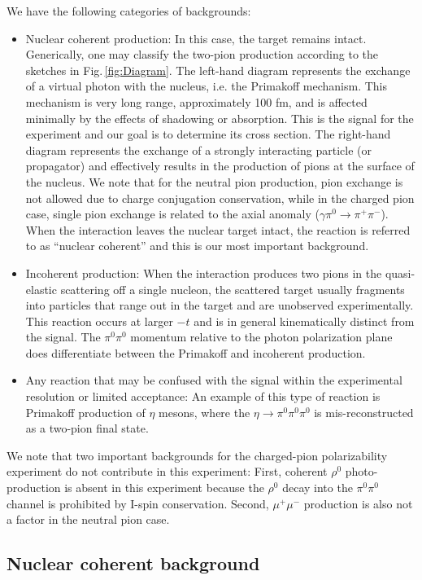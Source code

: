 We have the following categories of backgrounds:
\begin{itemize}
\item Nuclear coherent production: In this case, the target remains intact. Generically, one may classify the two-pion production
according to the sketches in Fig.\,\ref{fig:Diagram}. The left-hand diagram represents the exchange of a virtual photon with the nucleus, i.e. the Primakoff
mechanism. This mechanism is very long range, approximately 100 fm, and is affected minimally by the effects of shadowing or absorption.  This is the signal for the
experiment and our goal is to determine its cross section.
The right-hand diagram represents the exchange of a strongly interacting particle (or propagator) and effectively results in the production of pions at the
surface of the nucleus. We note that for the neutral pion production, pion exchange is not allowed due to charge conjugation conservation, while 
in the charged pion case, single pion exchange is related to the axial anomaly ($\gamma \pi^0 \rightarrow \pi^+ \pi^-$).  When the interaction leaves the
nuclear target intact, the reaction is referred to as ``nuclear coherent'' and this is our most important background. 
\item Incoherent production:  When the interaction produces two pions in the quasi-elastic scattering off a single
nucleon, the scattered target usually fragments into particles that range out in the target and are unobserved experimentally. This reaction occurs at larger $-t$ and is in general
kinematically distinct from the signal. The $\pi^0\pi^0$ momentum relative to the photon polarization plane does differentiate between the Primakoff and incoherent production.
\item Any reaction that may be confused with the signal within the experimental resolution or limited acceptance:
 An example of this type of reaction is Primakoff production of $\eta$ mesons, where the $\eta\rightarrow \pi^0 \pi^0 \pi^0$  is
mis-reconstructed as a two-pion final state. 
\end{itemize}

We note that two important backgrounds for the charged-pion polarizability experiment do not contribute in this experiment:
First, coherent $\rho^0$ photo-production is absent in this
experiment because the $\rho^0$ decay into the $\pi^0\pi^0$ channel is prohibited by I-spin conservation.  Second, $\mu^+\mu^-$ production is also not a factor in the neutral pion case.

\subsection{Nuclear coherent background \label{sec:NCback}}
   
